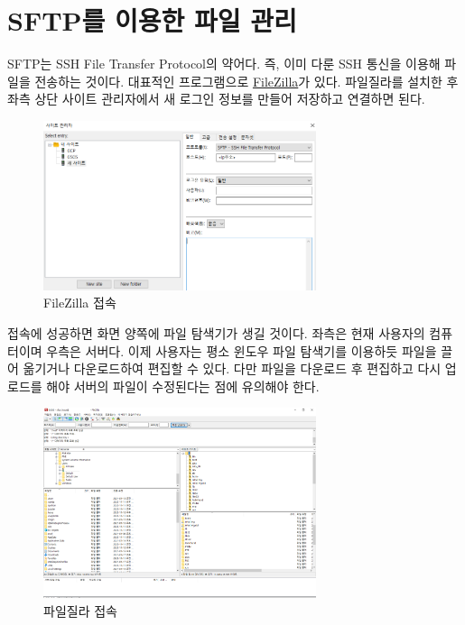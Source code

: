 \section{SFTP를 이용한 파일 관리}
	SFTP는 SSH File Transfer Protocol의 약어다. 즉, 이미 다룬 SSH 통신을 이용해 파일을 전송하는 것이다. 대표적인 프로그램으로 \href{https://filezilla-project.org/}{FileZilla}가 있다. 파일질라를 설치한 후 좌측 상단 사이트 관리자에서 새 로그인 정보를 만들어 저장하고 연결하면 된다.
	\begin{figure}[H]
	\begin{center}
        \includegraphics[width=8cm]{sftp2.png}
        \caption{FileZilla 접속}
    \end{center}
    \end{figure}
    접속에 성공하면 화면 양쪽에 파일 탐색기가 생길 것이다. 좌측은 현재 사용자의 컴퓨터이며 우측은 서버다. 이제 사용자는 평소 윈도우 파일 탐색기를 이용하듯 파일을 끌어 옮기거나 다운로드하여 편집할 수 있다. 다만 파일을 다운로드 후 편집하고 다시 업로드를 해야 서버의 파일이 수정된다는 점에 유의해야 한다.
	\begin{figure}[H]
	\begin{center}
        \includegraphics[width=8cm]{sftp3.png}
        \caption{파일질라 접속}
    \end{center}
    \end{figure}
	